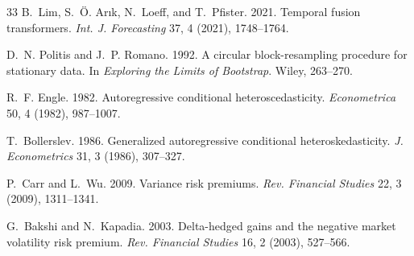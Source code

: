 \documentclass[sigconf,nonacm]{acmart}
\begin{document}
\begin{thebibliography}{33}
 B.~Lim, S.~\"O. Ar{\i}k, N.~Loeff, and T.~Pfister. 2021.
Temporal fusion transformers. \emph{Int. J. Forecasting} 37, 4 (2021),
1748--1764.

 D.~N. Politis and J.~P. Romano. 1992. A circular
block-resampling procedure for stationary data. In \emph{Exploring the Limits of
Bootstrap}. Wiley, 263--270.

 R.~F. Engle. 1982. Autoregressive conditional
heteroscedasticity. \emph{Econometrica} 50, 4 (1982), 987--1007.

 T.~Bollerslev. 1986. Generalized autoregressive
conditional heteroskedasticity. \emph{J. Econometrics} 31, 3 (1986), 307--327.

 P.~Carr and L.~Wu. 2009. Variance risk premiums. \emph{Rev.
Financial Studies} 22, 3 (2009), 1311--1341.

 G.~Bakshi and N.~Kapadia. 2003. Delta-hedged gains and the
negative market volatility risk premium. \emph{Rev. Financial Studies} 16, 2
(2003), 527--566.
\end{thebibliography}
\end{document}
